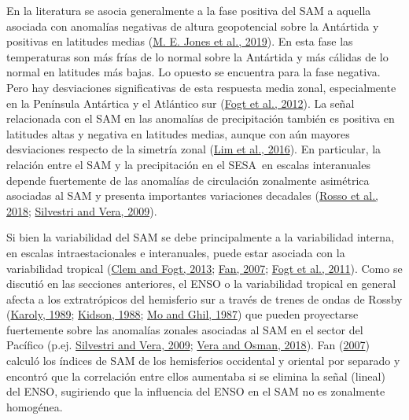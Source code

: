 \documentclass[12pt,oneside,a4paper]{reedthesis}
\begin{document}
En la literatura se asocia generalmente a la fase positiva del SAM a aquella asociada con anomalías negativas de altura geopotencial sobre la Antártida y positivas en latitudes medias (\protect\hyperlink{ref-jones2019}{M. E. Jones et al., 2019}).
En esta fase las temperaturas son más frías de lo normal sobre la Antártida y más cálidas de lo normal en latitudes más bajas.
Lo opuesto se encuentra para la fase negativa.
Pero hay desviaciones significativas de esta respuesta media zonal, especialmente en la Península Antártica y el Atlántico sur (\protect\hyperlink{ref-fogt2012}{Fogt et al., 2012}).
La señal relacionada con el SAM en las anomalías de precipitación también es positiva en latitudes altas y negativa en latitudes medias, aunque con aún mayores desviaciones respecto de la simetría zonal (\protect\hyperlink{ref-lim2016}{Lim et al., 2016}).
En particular, la relación entre el SAM y la precipitación en el SESA~en escalas interanuales depende fuertemente de las anomalías de circulación zonalmente asimétrica asociadas al SAM y presenta importantes variaciones decadales (\protect\hyperlink{ref-rosso2018}{Rosso et al., 2018}; \protect\hyperlink{ref-silvestri2009}{Silvestri and Vera, 2009}).

Si bien la variabilidad del SAM se debe principalmente a la variabilidad interna, en escalas intraestacionales e interanuales, puede estar asociada con la variabilidad tropical (\protect\hyperlink{ref-clem2013}{Clem and Fogt, 2013}; \protect\hyperlink{ref-fan2007}{Fan, 2007}; \protect\hyperlink{ref-fogt2011a}{Fogt et al., 2011}).
Como se discutió en las secciones anteriores, el ENSO o la variabilidad tropical en general afecta a los extratrópicos del hemisferio sur a través de trenes de ondas de Rossby (\protect\hyperlink{ref-karoly1989}{Karoly, 1989}; \protect\hyperlink{ref-kidson1988}{Kidson, 1988}; \protect\hyperlink{ref-mo1987}{Mo and Ghil, 1987}) que pueden proyectarse fuertemente sobre las anomalías zonales asociadas al SAM en el sector del Pacífico (p.ej. \protect\hyperlink{ref-silvestri2009}{Silvestri and Vera, 2009}; \protect\hyperlink{ref-vera2018}{Vera and Osman, 2018}).
Fan (\protect\hyperlink{ref-fan2007}{2007}) calculó los índices de SAM de los hemisferios occidental y oriental por separado y encontró que la correlación entre ellos aumentaba si se elimina la señal (lineal) del ENSO, sugiriendo que la influencia del ENSO en el SAM no es zonalmente homogénea.
\end{document}
